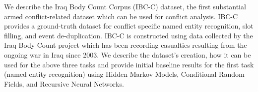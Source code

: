 We describe the Iraq Body Count Corpus (IBC-C) dataset, the first substantial armed conflict-related dataset which can be used for conflict analysis. IBC-C provides a ground-truth dataset for conflict specific named entity recognition, slot filling, and event de-duplication. IBC-C is constructed using data collected by the Iraq Body Count project  which has been recording casualties resulting from the ongoing war in Iraq since 2003. We describe the dataset's creation, how it can be used for the above three tasks and provide initial baseline results for the first task (named entity recognition) using Hidden Markov Models, Conditional Random Fields, and Recursive Neural Networks.
